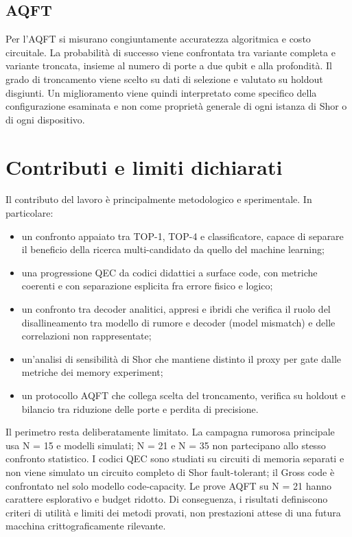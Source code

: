 \subsection{AQFT}\label{sec:finale_2_6_5}

Per l'AQFT si misurano congiuntamente accuratezza algoritmica e costo circuitale. La probabilità di successo viene confrontata tra variante completa e variante troncata, insieme al numero di porte a due qubit e alla profondità. Il grado di troncamento viene scelto su dati di selezione e valutato su holdout disgiunti. Un miglioramento viene quindi interpretato come specifico della configurazione esaminata e non come proprietà generale di ogni istanza di Shor o di ogni dispositivo. \cite{barencoAQFT1996,akoramurthy2026}

\section{Contributi e limiti dichiarati}\label{sec:finale_2_7}\label{sec:contributo_originale}

Il contributo del lavoro è principalmente metodologico e sperimentale. In particolare:

\begin{itemize}
\item
  un confronto appaiato tra TOP-1, TOP-4 e classificatore, capace di separare il beneficio della ricerca multi-candidato da quello del machine learning;
\item
  una progressione QEC da codici didattici a surface code, con metriche coerenti e con separazione esplicita fra errore fisico e logico;
\item
  un confronto tra decoder analitici, appresi e ibridi che verifica il ruolo del disallineamento tra modello di rumore e decoder (model mismatch) e delle correlazioni non rappresentate;
\item
  un'analisi di sensibilità di Shor che mantiene distinto il proxy per gate dalle metriche dei memory experiment;
\item
  un protocollo AQFT che collega scelta del troncamento, verifica su holdout e bilancio tra riduzione delle porte e perdita di precisione.
\end{itemize}

Il perimetro resta deliberatamente limitato. La campagna rumorosa principale usa N = 15 e modelli simulati; N = 21 e N = 35 non partecipano allo stesso confronto statistico. I codici QEC sono studiati su circuiti di memoria separati e non viene simulato un circuito completo di Shor fault-tolerant; il Gross code è confrontato nel solo modello code-capacity. Le prove AQFT su N = 21 hanno carattere esplorativo e budget ridotto. Di conseguenza, i risultati definiscono criteri di utilità e limiti dei metodi provati, non prestazioni attese di una futura macchina crittograficamente rilevante. \cite{googleQECBelowThreshold2025,alphaqubit2024,gidney2021,aharonov1997fault}